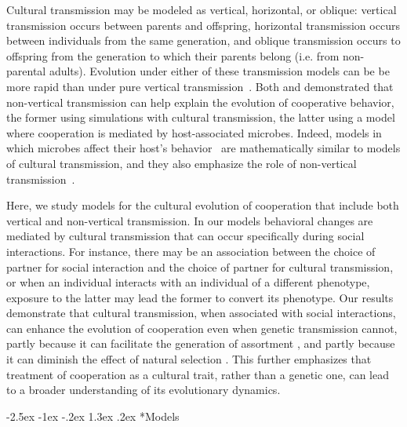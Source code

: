 \documentclass[12pt]{extarticle}
\makeatletter
\renewcommand\section{\@startsection {section}{1}{\z@}%
     {-2.5ex \@plus -1ex \@minus -.2ex}%
     {1.3ex \@plus.2ex}%
    {\Large\bfseries}}
\makeatother
\begin{document}
Cultural transmission may be  modeled as vertical, horizontal, or oblique:  vertical transmission occurs between parents and offspring, horizontal transmission occurs between individuals from the same generation, and oblique transmission occurs  to offspring from the generation to which their parents belong (i.e. from non-parental adults). 
Evolution under either of these transmission models can be be more rapid than under pure vertical transmission~\citep{cavalli1981cultural,lycett2008questions,ram2018evolution}.
Both \citet{woodcock2006significance} and \citet{lewin2017microbes} demonstrated that non-vertical transmission can help explain the evolution of cooperative behavior, the former using simulations with cultural transmission, the latter using a model where cooperation is mediated by host-associated microbes.
Indeed, models in which microbes affect their host's behavior~\citep{lewin2017microbes,lewin2020rockpaperscissors,gurevich2020parental} are mathematically similar to models of cultural transmission, and they also emphasize the role of non-vertical transmission~\citep{cavalli1981cultural}.

Here, we study models for the cultural evolution of cooperation that include both vertical and non-vertical transmission. 
In our models behavioral changes are mediated by cultural transmission that can occur specifically during social interactions.
For instance, there may be an association between the choice of partner for social interaction and the choice of partner for cultural transmission,
or when an individual interacts with an individual of a different phenotype,  exposure to the latter may lead the former to  convert its phenotype.
Our results demonstrate that cultural transmission, when associated with social interactions, can enhance the evolution of cooperation even when genetic transmission cannot, partly because it can facilitate the generation of assortment \citep{Fletcher2009assortment}, and partly because it can diminish the effect of natural selection \citep{ram2018evolution}.
This further emphasizes that treatment of cooperation as a cultural trait, rather than a genetic one, can lead to a broader understanding of its evolutionary dynamics.


\section*{Models}
\end{document}

